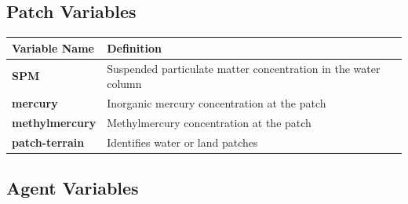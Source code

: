 \documentclass[
]{book}
\begin{document}
\subsection{\texorpdfstring{\textbf{Patch Variables}}{Patch Variables}}\label{patch-variables-5}

\begin{longtable}[]{@{}
  >{\raggedright\arraybackslash}p{}
  >{\raggedright\arraybackslash}p{}@{}}
\toprule\noalign{}
\begin{minipage}[b]{\linewidth}\raggedright
Variable Name
\end{minipage} & \begin{minipage}[b]{\linewidth}\raggedright
Definition
\end{minipage} \\
\midrule\noalign{}
\endhead
\bottomrule\noalign{}
\endlastfoot
\textbf{SPM} & Suspended particulate matter concentration in the water column \\
\textbf{mercury} & Inorganic mercury concentration at the patch \\
\textbf{methylmercury} & Methylmercury concentration at the patch \\
\textbf{patch-terrain} & Identifies water or land patches \\
\end{longtable}

\subsection{\texorpdfstring{\textbf{Agent Variables}}{Agent Variables}}\label{agent-variables-5}
\end{document}
